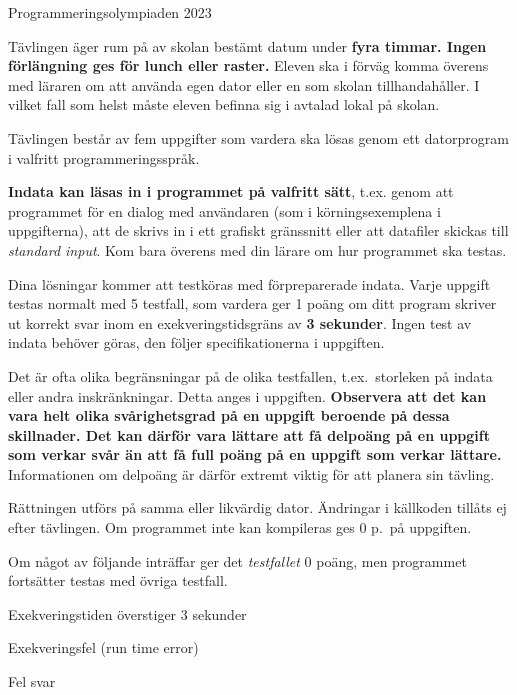 

\thispagestyle{fancy}
\lstset{basicstyle=\ttfamily,
  breaklines=true}

\begin{center}
\Huge{Programmeringsolympiaden 2023}
\end{center}
\vspace{-1.2cm} 
\begin{lista}
\item Tävlingen äger rum på av skolan bestämt datum under {\bf fyra
    timmar. Ingen förlängning ges för lunch eller raster.} Eleven ska i förväg komma överens med läraren om att använda egen dator eller en som skolan tillhandahåller. I vilket fall som helst måste eleven befinna sig i avtalad lokal på skolan. 
\item Tävlingen består av fem uppgifter som vardera ska lösas genom ett
  datorprogram i valfritt programmeringsspråk.
\item {\bf Indata kan läsas in i programmet på valfritt sätt}, t.ex. genom att programmet för en dialog med användaren (som i körningsexemplena i uppgifterna), att de skrivs in i ett grafiskt gränssnitt eller att datafiler skickas till {\em standard input}. Kom bara överens med din lärare om hur programmet ska testas.
\item Dina lösningar kommer att testköras med förpreparerade
  indata. Varje uppgift testas normalt med 5 testfall, som vardera ger
  1 poäng om ditt program skriver ut korrekt svar inom en exekveringstidsgräns av
  {\bf 3 sekunder}. Ingen test av indata behöver göras, den följer specifikationerna 
i uppgiften.
\item Det är ofta olika begränsningar på de olika testfallen, t.ex.\ storleken på
indata eller andra inskränkningar. Detta anges i uppgiften. {\bf Observera att det kan vara
helt olika svårighetsgrad på en uppgift beroende på dessa skillnader. Det kan därför vara
lättare att få delpoäng på en uppgift som verkar svår än att få full
poäng på en uppgift som verkar lättare.} Informationen om delpoäng är
därför extremt viktig för att planera sin
tävling.
\item Rättningen utförs på samma eller likvärdig dator. Ändringar
  i källkoden tillåts ej efter tävlingen. Om programmet
  inte kan kompileras ges 0 p.\ på uppgiften. 
\item Om något av följande inträffar ger
  det {\em testfallet} 0 poäng, men programmet fortsätter testas med övriga testfall.
\begin{lista}
\item Exekveringstiden överstiger 3 sekunder \vspace{-0.2cm}
\item Exekveringsfel (run time error) \vspace{-0.2cm}
\item Fel svar \vspace{-0.2cm}
\end{lista}


\end{lista}
